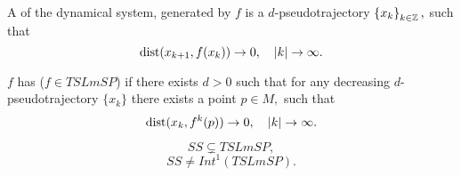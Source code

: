 \begin{deffnon}
A  of the dynamical system, generated by $f$ is a $d$-pseudotrajectory $\left\{ {x}_{k} \right\}_{k\in\mathbb Z},$ such that
\begin{equation*}
\operatorname{dist}(x_{k+1},f(x_k))\to 0,\quad |k|\to \infty.
\end{equation*}
\end{deffnon}
%
\devskip
%
\begin{deffnon}
$f$ has  ($f\in TSLmSP$)
if there exists $d>0$ such that for any decreasing $d$-pseudotrajectory $\{x_k\}$ there exists a point $p\in M,$ such that
$$
\operatorname{dist}(x_{k},f^k(p)) \to  0,\quad |k|\to \infty.
$$
\end{deffnon}
%
\devskip
%
\begin{theoremnon}[Pilyugin, 2008]
$$ SS \subsetneq TSLmSP, $$
$$ SS \neq Int^1 (TSLmSP). $$
\end{theoremnon}
%
\devskip
